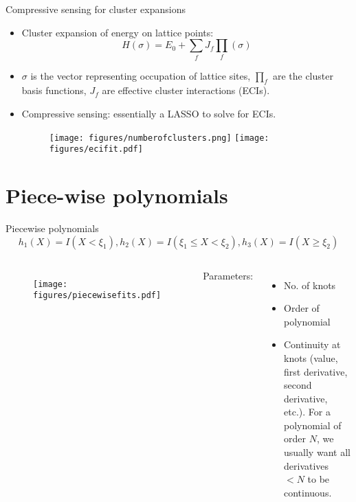 \documentclass[aspectratio=169]{beamer}
\begin{document}
\begin{frame}{Compressive sensing for cluster expansions}
    \begin{itemize}
        \item Cluster expansion of energy on lattice points:
        \begin{equation*}
            H(\sigma) = E_0 + \sum_f J_f \prod_f(\sigma)
        \end{equation*}
        \item $\sigma$ is the vector representing occupation of lattice sites, $\prod_f$ are the cluster basis functions, $J_f$ are effective cluster interactions (ECIs).
        \item Compressive sensing: essentially a LASSO to solve for ECIs.\cite{nelsonCompressiveSensingParadigm2013}
        \begin{figure}
            \centering
            \texttt{[image: figures/numberofclusters.png]}
            \texttt{[image: figures/ecifit.pdf]}
        \end{figure}
    \end{itemize}
\end{frame} 

\section{Piece-wise polynomials}

\begin{frame}{Piecewise polynomials}
    \begin{equation*}
        h_1(X) = I(X < \xi_1), h_2(X) = I(\xi_1 \leq X < \xi_2), h_3(X) = I(X \geq \xi_2)
    \end{equation*}
    \begin{columns}
    \begin{figure}
        \centering
        \texttt{[image: figures/piecewisefits.pdf]}
    \end{figure}
    Parameters:
    \begin{itemize}
        \item No. of knots
        \item Order of polynomial
        \item Continuity at knots (value, first derivative, second derivative, etc.). For a polynomial of order $N$, we usually want all derivatives $< N$ to be continuous. 
    \end{itemize}
    \end{columns}
\end{frame} 
\end{document}

